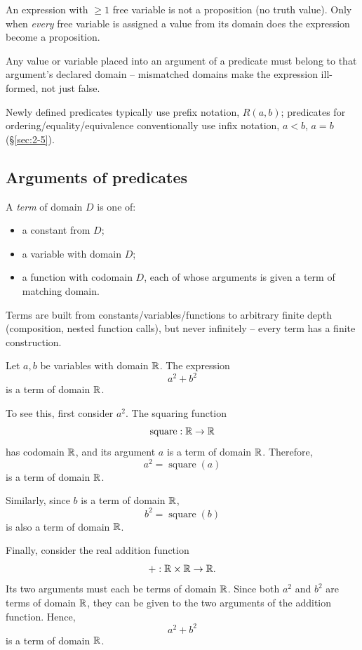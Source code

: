 \documentclass[11pt]{article}
\begin{document}
\begin{note}
An expression with $\ge1$ free variable is not a proposition (no truth value). Only when \emph{every} free variable is assigned a value from its domain does the expression become a proposition.
\end{note}

\begin{note}
Any value or variable placed into an argument of a predicate must belong to that argument's declared domain -- mismatched domains make the expression ill-formed, not just false.
\end{note}

\begin{note}
Newly defined predicates typically use prefix notation, $R(a,b)$; predicates for ordering/equality/equivalence conventionally use infix notation, $a<b$, $a=b$ (\S\ref{sec:2-5}).
\end{note}

\subsection{Arguments of predicates}
\label{sec:5-4}

\begin{definition}
A \emph{term} of domain $D$ is one of:
\begin{itemize}
    \item a constant from $D$;
    \item a variable with domain $D$;
    \item a function with codomain $D$, each of whose arguments is given a term of matching domain.
\end{itemize}
\end{definition}

\begin{note}
Terms are built from constants/variables/functions to arbitrary finite depth (composition, nested function calls), but never infinitely -- every term has a finite construction.
\end{note}

\begin{example}
Let $a,b$ be variables with domain $\mathbb{R}$. The expression
\[
a^2+b^2
\]
is a term of domain $\mathbb{R}$.

To see this, first consider $a^2$. The squaring function
\[
\operatorname{square}:\mathbb{R}\to\mathbb{R}
\]
has codomain $\mathbb{R}$, and its argument $a$ is a term of domain $\mathbb{R}$. Therefore,
\[
a^2=\operatorname{square}(a)
\]
is a term of domain $\mathbb{R}$.

Similarly, since $b$ is a term of domain $\mathbb{R}$,
\[
b^2=\operatorname{square}(b)
\]
is also a term of domain $\mathbb{R}$.

Finally, consider the real addition function
\[
+:\mathbb{R}\times\mathbb{R}\to\mathbb{R}.
\]
Its two arguments must each be terms of domain $\mathbb{R}$. Since both $a^2$ and $b^2$ are terms of domain $\mathbb{R}$, they can be given to the two arguments of the addition function. Hence,
\[
a^2+b^2
\]
is a term of domain $\mathbb{R}$.
\end{example}
\end{document}

